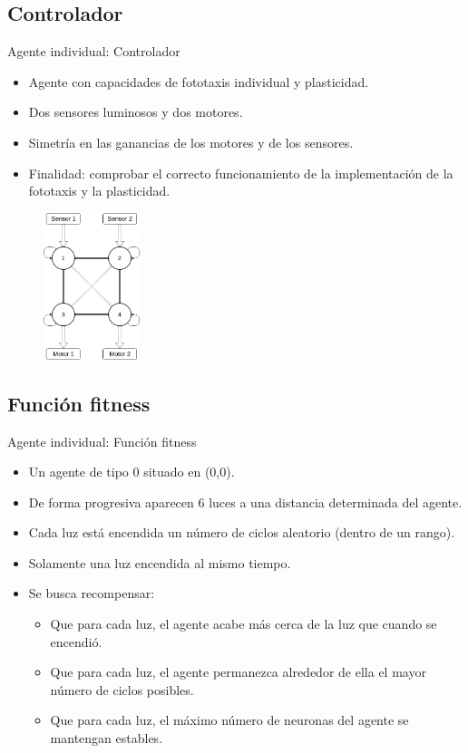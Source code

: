 \documentclass[aspectratio=169]{beamer}
\begin{document}
\subsection{Controlador}
\begin{frame}{Agente individual: Controlador}
  \begin{itemize}
    \item Agente con capacidades de fototaxis individual y plasticidad.
    \item Dos sensores luminosos y dos motores.
    \item Simetría en las ganancias de los motores y de los sensores.
    \item Finalidad: comprobar el correcto funcionamiento de la implementación de la fototaxis y la plasticidad.
  \end{itemize}
  \begin{figure}
    \centering
  \includegraphics[width=0.25\textwidth,height=0.5\textheight]{Imagenes/Agent0Controller}
\end{figure}
\end{frame}

\subsection{Función fitness}
\begin{frame}{Agente individual: Función fitness}
  \begin{itemize}
    \item Un agente de tipo 0 situado en (0,0).
    \item De forma progresiva aparecen 6 luces a una distancia determinada del agente.
    \item Cada luz está encendida un número de ciclos aleatorio (dentro de un rango).
    \item Solamente una luz encendida al mismo tiempo.
    \item Se busca recompensar:
    \begin{itemize}
      \item Que para cada luz, el agente acabe más cerca de la luz que cuando se encendió.
      \item Que para cada luz, el agente permanezca alrededor de ella el mayor número de ciclos posibles.
      \item Que para cada luz, el máximo número de neuronas del agente se mantengan estables.
    \end{itemize}
  \end{itemize}
\end{frame}
\end{document}
